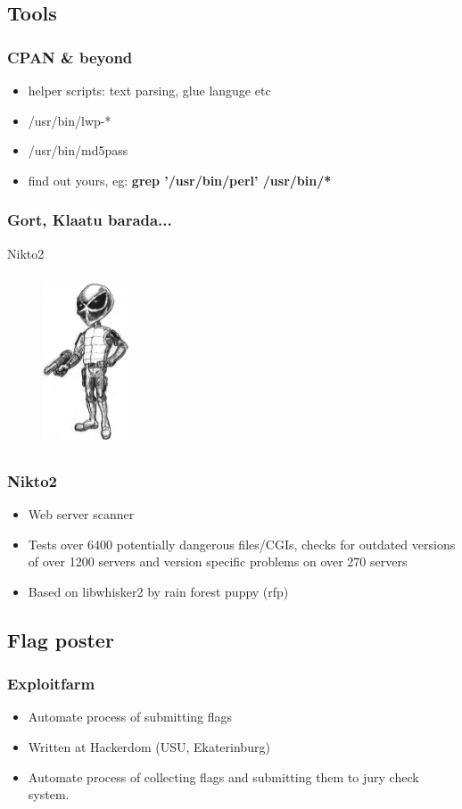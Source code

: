 \documentclass{beamer}
\begin{document}
\subsection{Tools}
\frame
{
\frametitle{CPAN \& beyond}
\begin{itemize}
\item<1-> helper scripts: text parsing, glue languge etc
\item<2-> /usr/bin/lwp-*
\item<2-> /usr/bin/md5pass
\item<3-> find out yours, eg: \textbf{grep '/usr/bin/perl' /usr/bin/*}
\end{itemize}
}

\frame
{
\frametitle{Gort, Klaatu barada...}
Nikto2
\begin{figure}
\includegraphics[width=1in,height=2in]{pics/nikto.png}
\end{figure}
}

\frame
{
\frametitle{Nikto2}
\begin{itemize}
\item Web server scanner
\item Tests over 6400 potentially dangerous files/CGIs, checks for outdated versions of over 1200 servers and version specific problems on over 270 servers
\item Based on libwhisker2 by rain forest puppy (rfp)
\end{itemize}
}

\subsection{Flag poster}
\frame
{
\frametitle{Exploitfarm}
\begin{itemize}
\item Automate process of submitting flags
\item Written at Hackerdom (USU, Ekaterinburg)
\item Automate process of collecting flags and submitting them to jury check system.
\end{itemize}
}
\end{document}
